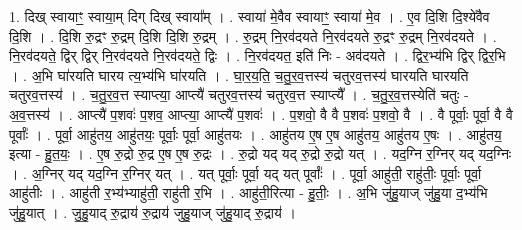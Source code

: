 \documentclass[17pt]{extarticle}
\begin{document}
1. दिख् स्वायाꣳ॒॒ स्वाया॒म् दिग् दिख् स्वाया᳚म् । . स्वाया॑ मे॒वैव स्वायाꣳ॒॒ स्वाया॑ मे॒व । . ए॒व दि॒शि दि॒श्ये॑वैव दि॒शि । . दि॒शि रु॒द्रꣳ रु॒द्रम् दि॒शि दि॒शि रु॒द्रम् । . रु॒द्रम् नि॒रव॑दयते नि॒रव॑दयते रु॒द्रꣳ रु॒द्रम् नि॒रव॑दयते । . नि॒रव॑दयते॒ द्विर् द्विर् नि॒रव॑दयते नि॒रव॑दयते॒ द्विः । . नि॒रव॑दयत॒ इति॑ निः - अव॑दयते । . द्विर॒भ्य॑भि द्विर् द्विर॒भि । . अ॒भि घा॑रयति घारय त्य॒भ्य॑भि घा॑रयति । . घा॒र॒य॒ति॒ च॒तु॒र॒व॒त्तस्य॑ चतुरव॒त्तस्य॑ घारयति घारयति चतुरव॒त्तस्य॑ । . च॒तु॒र॒व॒त्त स्याप्त्या॒ आप्त्यै॑ चतुरव॒त्तस्य॑ चतुरव॒त्त स्याप्त्यै᳚ । . च॒तु॒र॒व॒त्तस्येति॑ चतुः - अ॒व॒त्तस्य॑ । . आप्त्यै॑ प॒शवः॑ प॒शव॒ आप्त्या॒ आप्त्यै॑ प॒शवः॑ । . प॒शवो॒ वै वै प॒शवः॑ प॒शवो॒ वै । . वै पूर्वाः॒ पूर्वा॒ वै वै पूर्वाः᳚ । . पूर्वा॒ आहु॑तय॒ आहु॑तयः॒ पूर्वाः॒ पूर्वा॒ आहु॑तयः । . आहु॑तय ए॒ष ए॒ष आहु॑तय॒ आहु॑तय ए॒षः । . आहु॑तय॒ इत्या - हु॒त॒यः॒ । . ए॒ष रु॒द्रो रु॒द्र ए॒ष ए॒ष रु॒द्रः । . रु॒द्रो यद् यद् रु॒द्रो रु॒द्रो यत् । . यद॒ग्नि र॒ग्निर् यद् यद॒ग्निः । . अ॒ग्निर् यद् यद॒ग्नि र॒ग्निर् यत् । . यत् पूर्वाः॒ पूर्वा॒ यद् यत् पूर्वाः᳚ । . पूर्वा॒ आहु॑ती॒ राहु॑तीः॒ पूर्वाः॒ पूर्वा॒ आहु॑तीः । . आहु॑ती र॒भ्य॑भ्याहु॑ती॒ राहु॑ती र॒भि । . आहु॑ती॒रित्या - हु॒तीः॒ । . अ॒भि जु॑हु॒याज् जु॑हु॒या द॒भ्य॑भि जु॑हु॒यात् । . जु॒हु॒याद् रु॒द्राय॑ रु॒द्राय॑ जुहु॒याज् जु॑हु॒याद् रु॒द्राय॑ । \newline
\end{document}
